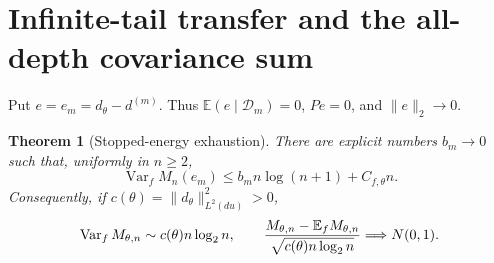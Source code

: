 \documentclass[11pt]{article}
\numberwithin{equation}{section}
\newtheorem{theorem}{Theorem}[section]
\newcommand{\E}{\mathbb E}\newcommand{\Pp}{\mathbb P}
\newcommand{\Var}{\operatorname{Var}}\newcommand{\Cov}{\operatorname{Cov}}
\newcommand{\1}{\mathbf 1}\newcommand{\F}{\mathcal F}\newcommand{\D}{\mathcal D}
\newcommand{\norm}[1]{\lVert#1\rVert}
\begin{document}
\section{Infinite-tail transfer and the all-depth covariance sum}
Put $e=e_m=d_\theta-d^{(m)}$.  Thus
$\E(e\mid\D_m)=0$, $Pe=0$, and $\norm e_2\to0$.

\begin{theorem}[Stopped-energy exhaustion]\label{thm:tail}
There are explicit numbers $b_m\to0$ such that, uniformly in $n\ge2$,
\begin{equation}\label{eq:tailvar}
 \Var_f M_n(e_m)\le b_m n\log(n+1)+C_{f,\theta}n.
\end{equation}
Consequently, if $c(\theta)=\norm{d_\theta}_{L^2(du)}^2>0$,
\begin{equation}\label{eq:canonical}
 \Var_fM_{\theta,n}\sim c(\theta)n\log_2n,\qquad
 {M_{\theta,n}-\E_fM_{\theta,n}\over\sqrt{c(\theta)n\log_2n}}
 \Longrightarrow N(0,1).
\end{equation}
\end{theorem}
\end{document}
